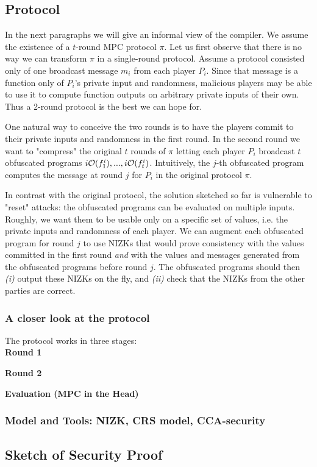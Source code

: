 


\subsection{Protocol}
In the next paragraphs we will give an informal view of the compiler.
We assume the existence of a $t$-round MPC protocol $\pi$. %
Let us first observe  that there is no way we can transform $\pi$ in a single-round protocol. Assume a protocol consisted only of one broadcast message $m_i$ from each player $P_i$. Since that message is a function only of $P_i$'s private input and randomness, malicious players may be able to use it to compute function outputs on arbitrary private inputs of their own. Thus a 2-round protocol is the best we can hope for.

One natural way to conceive the two rounds is to have the players commit to their private inputs and randomness in the first round.
In the second round we want to "compress" the original $t$ rounds of $\pi$ letting each player $P_i$ broadcast $t$ obfuscated programs
$i\mathcal{O}(f^i_1),...,i\mathcal{O}(f^i_t)$. Intuitively, the $j$-th obfuscated program computes the message at round $j$ for $P_i$ in the original protocol $\pi$.

In contrast with the original protocol, the solution sketched so far is vulnerable to "reset" attacks: the obfuscated programs can be evaluated on multiple inputs. Roughly, we want them to be usable only on a specific set of values, i.e. the private inputs and randomness of each player.
We can augment each obfuscated program for round $j$ to use NIZKs that would prove consistency with the values committed in the first round \emph{and} with the values and messages generated from the obfuscated programs before round $j$. The obfuscated programs should then \emph{(i)} output these NIZKs on the fly, and \emph{(ii)} check that the NIZKs from the other parties are correct.

\subsubsection{A closer look at the protocol}

The protocol works in three stages:\\
\noindent
\textbf{Round 1}

\noindent
\textbf{Round 2}

\noindent
\textbf{Evaluation (MPC in the Head)}




\subsubsection{Model and Tools: NIZK, CRS model, CCA-security}

\subsection{Sketch of Security Proof}

